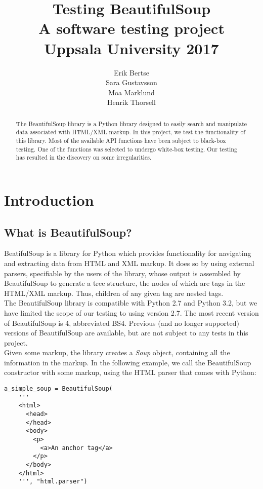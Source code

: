 \documentclass[10pt]{article}
\title{Testing BeautifulSoup \\ \small A software testing project \\ Uppsala University 2017}
\author{Erik Bertse \\ Sara Gustavsson \\ Moa Marklund \\ Henrik Thorsell}
\date{}
\begin{document}
\maketitle

\begin{abstract}
  The BeautifulSoup library is a Python library designed to easily search and manipulate data associated with HTML/XML markup. In this project, we test the functionality of this library. Most of the available API functions have been subject to black-box testing. One of the functions was selected to undergo white-box testing. Our testing has resulted in the discovery on some irregularities.
\end{abstract}

\section{Introduction}

\subsection{What is BeautifulSoup?}
 BeatifulSoup is a library for Python which provides functionality for navigating and extracting data from HTML and XML markup. It does so by using external parsers, specifiable by the users of the library, whose output is assembled by BeautifulSoup to generate a tree structure, the nodes of which are tags in the HTML/XML markup. Thus, children of any given tag are nested tags. \\

 The BeautifulSoup library is compatible with Python 2.7 and Python 3.2, but we have limited the scope of our testing to using version 2.7. The most recent version of BeautifulSoup is 4, abbreviated BS4. Previous (and no longer supported) versions of BeautifulSoup are available, but are not subject to any tests in this project.  \\

Given some markup, the library creates a \textit{Soup} object, containing all the information in the markup. In the following example, we call the BeautifulSoup constructor with some markup, using the HTML parser that comes with Python: 
\newpage

\begin{lstlisting}[style = pythonstyle]
a_simple_soup = BeautifulSoup(
    '''
    <html>
      <head>
      </head>
      <body>
        <p>
          <a>An anchor tag</a>
        </p>
      </body>
    </html>
    ''', "html.parser")
\end{lstlisting}
\end{document}

